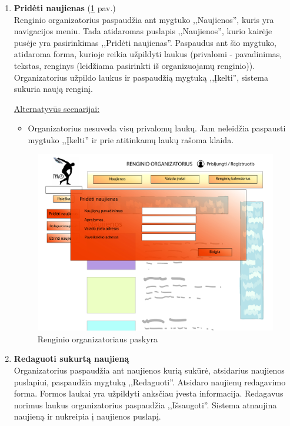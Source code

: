 \documentclass{VUMIFPSkursinis}
\begin{document}
\begin{enumerate} [label = \textbf{U\arabic*.}]
			\item \textbf{Pridėti naujienas} (\ref{fig:uzd_org_pridetiNaujienas} pav.)\\
					Renginio organizatorius paspaudžia ant mygtuko ,,Naujienos'', kuris yra navigacijos meniu. Tada atidaromas puslapis ,,Naujienos'', kurio kairėje pusėje yra pasirinkimas ,,Pridėti naujienas''. Paspaudus ant šio mygtuko, atidaroma forma, kurioje reikia užpildyti laukus (privalomi - pavadinimas, tekstas, renginys (leidžiama pasirinkti iš organizuojamų renginio)). Organizatorius užpildo laukus ir paspaudžią mygtuką ,,Įkelti'', sistema sukuria naują renginį.
					
					\underline{Alternatyvūs scenarijai:}
					\begin{itemize}
						\item Organizatorius nesuveda visų privalomų laukų. Jam neleidžia paspausti mygtuko ,,Įkelti'' ir prie atitinkamų laukų rašoma klaida.
					\end{itemize}
				
				\begin{figure}[H]
					\centering
					\includegraphics[width=\textwidth]{img/PSI4/OrganizatoriusNaujienos-01.jpg}
					\caption{Renginio organizatoriaus paskyra}
					\label{fig:uzd_org_pridetiNaujienas}
				\end{figure}
				
			\item \textbf{Redaguoti sukurtą naujieną}   \\
					Organizatorius paspaudžia ant naujienos kurią sukūrė, atsidarius naujienos puslapiui, paspaudžia mygtuką ,,Redaguoti''. Atsidaro naujienų redagavimo forma. Formos laukai yra užpildyti anksčiau įvesta informacija. Redagavus norimus laukus organizatorius paspaudžia ,,Išsaugoti''. Sistema atnaujina naujieną ir nukreipia į naujienos puslapį. 
					

\end{enumerate}
\end{document}
